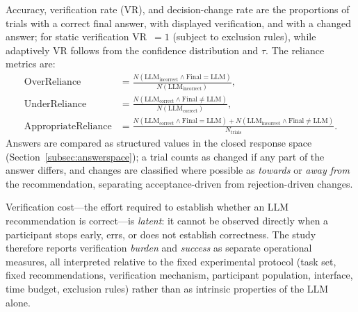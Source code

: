 \documentclass[oneside,final,14pt,a4paper]{extreport}
\begin{document}
Accuracy, verification rate (VR), and decision-change rate are the proportions
of trials with a correct final answer, with displayed verification, and with a
changed answer; for static verification VR~$=1$ (subject to exclusion rules),
while adaptively VR follows from the confidence distribution and $\tau$. The
reliance metrics are:
\begin{align*}
\text{OverReliance} &= \tfrac{N(\text{LLM}_{\text{incorrect}}\land \text{Final}=\text{LLM})}{N(\text{LLM}_{\text{incorrect}})},\\
\text{UnderReliance} &= \tfrac{N(\text{LLM}_{\text{correct}}\land \text{Final}\neq\text{LLM})}{N(\text{LLM}_{\text{correct}})},\\
\text{AppropriateReliance} &= \tfrac{N(\text{LLM}_{\text{correct}}\land \text{Final}=\text{LLM}) + N(\text{LLM}_{\text{incorrect}}\land \text{Final}\neq\text{LLM})}{N_{\text{trials}}}.
\end{align*}
Answers are compared as structured values in the closed response space
(Section~\ref{subsec:answerspace}); a trial counts as changed if any part of
the answer differs, and changes are classified where possible as
\emph{towards} or \emph{away from} the recommendation, separating
acceptance-driven from rejection-driven changes.

Verification cost---the effort required to establish whether an LLM
recommendation is correct---is \emph{latent}: it cannot be observed directly
when a participant stops early, errs, or does not establish correctness. The
study therefore reports verification \emph{burden} and \emph{success} as
separate operational measures, all interpreted relative to the fixed
experimental protocol (task set, fixed recommendations, verification
mechanism, participant population, interface, time budget, exclusion rules)
rather than as intrinsic properties of the LLM alone.
\end{document}
